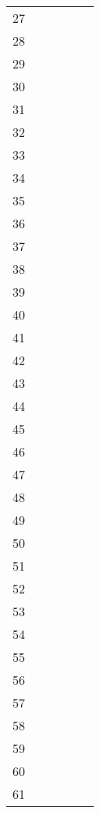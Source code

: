 \begin{longtable}[l]{|c|l|l|l|l|l|}
	27 	& 					& 					& 					&			\\ 	
	28 	& 					& 					& 					&			\\ 
	29 	& 		 			& 					& 					& 			\\ 
	30 	& 					& 					& 					& 			\\ 
	31 	& 					& 					& 					&			\\ 	
	32 	& 					& 					& 					&			\\ 
	33 	& 		 			& 					& 					& 			\\ 
	34 	& 					& 					& 					& 			\\ 
	35 	& 					& 					& 					&			\\ 	
	36 	& 					& 					& 					&			\\ 
	37 	& 		 			& 					& 					& 			\\ 
	38 	& 					& 					& 					& 			\\ 
	39 	& 					& 					& 					&			\\ 	
	40 	& 					& 					& 					&			\\ 
	41 	& 		 			& 					& 					& 			\\ 
	42 	& 					& 					& 					& 			\\ 
	43 	& 					& 					& 					&			\\ 	
	44 	& 					& 					& 					&			\\ 
	45 	& 		 			& 					& 					& 			\\ 
	46 	& 					& 					& 					& 			\\ 
	47 	& 					& 					& 					&			\\ 	
	48 	& 					& 					& 					&			\\ 
	49 	& 		 			& 					& 					& 			\\ 
	50 	& 					& 					& 					& 			\\ 
	51 	& 					& 					& 					&			\\ 	
	52 	& 					& 					& 					&			\\ 
	53 	& 		 			& 					& 					& 			\\ 
	54 	& 					& 					& 					& 			\\ 
	55 	& 					& 					& 					&			\\ 	
	56 	& 					& 					& 					&			\\ 
	57 	& 		 			& 					& 					& 			\\ 
	58 	& 					& 					& 					& 			\\ 
	59 	& 					& 					& 					&			\\ 	
	60 	& 					& 					& 					&			\\ 
	61 	& 		 			& 					& 					& 			\\ 

\end{longtable}
